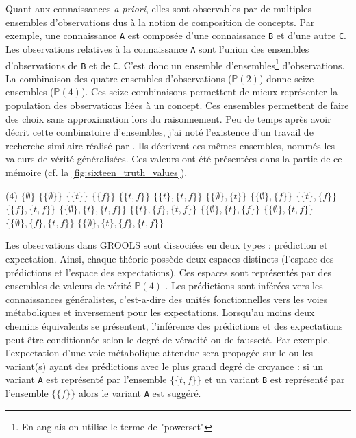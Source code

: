 \begin{refsegment}
Quant aux connaissances \textit{a priori}, elles sont observables par de multiples ensembles d'observations dus à la notion de composition de concepts. Par exemple, une connaissance \texttt{A} est composée d'une connaissance \texttt{B} et d'une autre \texttt{C}. Les observations relatives à la connaissance \texttt{A} sont l'union des ensembles d'observations de \texttt{B} et de \texttt{C}. C'est donc un ensemble d'ensembles\footnote{En anglais on utilise le terme de "powerset"} d'observations. La combinaison des quatre ensembles d'observations ($\mathbb{P}(2)$) donne seize ensembles ($\mathbb{P}(4)$). Ces seize combinaisons permettent de mieux représenter la population des observations liées à un concept. Ces ensembles permettent de faire des choix sans approximation lors du raisonnement. Peu de temps après avoir décrit cette combinatoire d'ensembles, j'ai noté l'existence d'un travail de recherche similaire réalisé par \citeauthor{shramko2005some}. Ils décrivent ces mêmes ensembles, nommés les valeurs de vérité généralisées. Ces valeurs ont été présentées dans la partie   de ce mémoire (cf. la \cref{fig:sixteen_truth_values}).

\begin{tasks}[counter-format = {tsk[1].},label-offset = {0.8em},label-format = {\bfseries}](4)
	\task $\{\emptyset\}$
	\task $\{\{\emptyset\}\}$
	\task $\{\{t\}\}$
	\task $\{\{f\}\}$
	\task $\{\{t,f\}\}$
	\task $\{\{t\},\{t,f\}\}$
	\task $\{\{\emptyset\},\{t\}\}$
	\task $\{\{\emptyset\},\{f\}\}$
	\task $\{\{t\},\{f\}\}$
	\task $\{\{f\},\{t,f\}\}$
	\task $\{\{\emptyset\},\{t\},\{t,f\}\}$
	\task $\{\{t\},\{f\},\{t,f\}\}$
	\task $\{\{\emptyset\},\{t\},\{f\}\}$
	\task $\{\{\emptyset\},\{t,f\}\}$
	\task $\{\{\emptyset\},\{f\},\{t,f\}\}$
	\task $\{\{\emptyset\},\{t\},\{f\},\{t,f\}\}$
\end{tasks}

Les observations dans GROOLS sont dissociées en deux types : prédiction et expectation. Ainsi, chaque théorie possède deux espaces distincts (l'espace des prédictions et l'espace des expectations). Ces espaces sont représentés par des ensembles de valeurs de vérité $\mathbb{P}(4)$ . Les prédictions sont inférées vers les connaissances généralistes, c'est-a-dire des unités fonctionnelles vers les voies métaboliques et inversement pour les expectations. Lorsqu'au moins deux chemins équivalents se présentent, l'inférence des prédictions et des expectations peut être conditionnée selon le degré de véracité ou de fausseté. Par exemple, l'expectation d'une voie métabolique attendue sera propagée sur le ou les variant(s) ayant des prédictions avec le plus grand degré de croyance : si un variant \texttt{A} est représenté par l'ensemble $\{\{t,f\}\}$ et un variant  \texttt{B} est représenté par l'ensemble $\{\{f\}\}$ alors le variant \texttt{A} est suggéré.


\end{refsegment}
